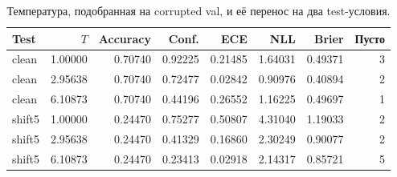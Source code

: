 \begin{table}[H]\centering\footnotesize
\setlength{\tabcolsep}{4pt}
\caption{Температура, подобранная на corrupted val, и её перенос на два test-условия.}\label{tab:t5}
\begin{tabular}{lrrrrrrr}
\toprule
Test & $T$ & Accuracy & Conf. & ECE & NLL & Brier & Пусто \\
\midrule
clean & 1.00000 & 0.70740 & 0.92225 & 0.21485 & 1.64031 & 0.49371 & 3 \\
clean & 2.95638 & 0.70740 & 0.72477 & 0.02842 & 0.90976 & 0.40894 & 2 \\
clean & 6.10873 & 0.70740 & 0.44196 & 0.26552 & 1.16225 & 0.49697 & 1 \\
shift5 & 1.00000 & 0.24470 & 0.75277 & 0.50807 & 4.31040 & 1.19033 & 2 \\
shift5 & 2.95638 & 0.24470 & 0.41329 & 0.16860 & 2.30249 & 0.90077 & 2 \\
shift5 & 6.10873 & 0.24470 & 0.23413 & 0.02918 & 2.14317 & 0.85721 & 5 \\
\bottomrule
\end{tabular}
\end{table}
